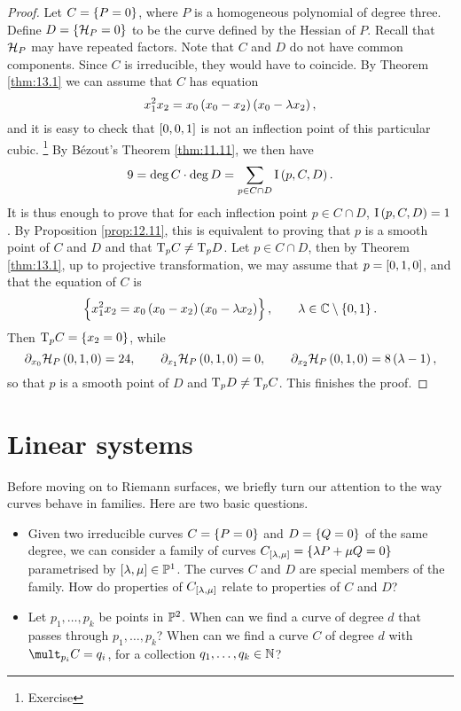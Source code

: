 \begin{proof}
Let $ C = \cbr{P = 0} $, where $ P $ is a homogeneous polynomial of degree three. Define $ D = \cbr{\HHH_P = 0} $ to be the curve defined by the Hessian of $ P $. Recall that $ \mathcal{H}_P $ may have repeated factors. Note that $ C $ and $ D $ do not have common components. Since $ C $ is irreducible, they would have to coincide. By Theorem \ref{thm:13.1} we can assume that $ C $ has equation
$$ x_1^2x_2 = x_0\br{x_0 - x_2}\br{x_0 - \lambda x_2}, $$
and it is easy to check that $ \sbr{0, 0, 1} $ is not an inflection point of this particular cubic. \footnote{Exercise} By B\'ezout's Theorem \ref{thm:11.11}, we then have
$$ 9 = \deg C \cdot \deg D = \sum_{p \in C \cap D} \I\br{p, C, D}. $$
It is thus enough to prove that for each inflection point $ p \in C \cap D $, $ \I\br{p, C, D} = 1 $. By Proposition \ref{prop:12.11}, this is equivalent to proving that $ p $ is a smooth point of $ C $ and $ D $ and that $ \mathrm{T}_p C \ne \mathrm{T}_p D $. Let $ p \in C \cap D $, then by Theorem \ref{thm:13.1}, up to projective transformation, we may assume that $ p = \sbr{0, 1, 0} $, and that the equation of $ C $ is
$$ \cbr{x_1^2x_2 = x_0\br{x_0 - x_2}\br{x_0 - \lambda x_2}}, \qquad \lambda \in \CC \setminus \cbr{0, 1}. $$
Then $ \T_p C = \cbr{x_2 = 0} $, while
$$ \partial_{x_0}\HHH_P\br{0, 1, 0} = 24, \qquad \partial_{x_1}\HHH_P\br{0, 1, 0} = 0, \qquad \partial_{x_2}\HHH_P\br{0, 1, 0} = 8\br{\lambda - 1}, $$
so that $ p $ is a smooth point of $ D $ and $ \mathrm{T}_p D \ne \mathrm{T}_p C $. This finishes the proof.
\end{proof}

\pagebreak

\section{Linear systems}

Before moving on to Riemann surfaces, we briefly turn our attention to the way curves behave in families. Here are two basic questions.
\begin{itemize}
\item Given two irreducible curves $ C = \cbr{P = 0} $ and $ D = \cbr{Q = 0} $ of the same degree, we can consider a family of curves $ C_{\sbr{\lambda, \mu}} = \cbr{\lambda P + \mu Q = 0} $ parametrised by $ \sbr{\lambda, \mu} \in \PP^1 $. The curves $ C $ and $ D $ are special members of the family. How do properties of $ C_{\sbr{\lambda, \mu}} $ relate to properties of $ C $ and $ D $?
\item Let $ p_1, \dots, p_k $ be points in $ \mathbb{P}^2 $. When can we find a curve of degree $ d $ that passes through $ p_1, \dots, p_k $? When can we find a curve $ C $ of degree $ d $ with $ \mult_{p_i} C = q_i $, for a collection $ q_1, \dots, q_k \in \mathbb{N} $?
\end{itemize}

